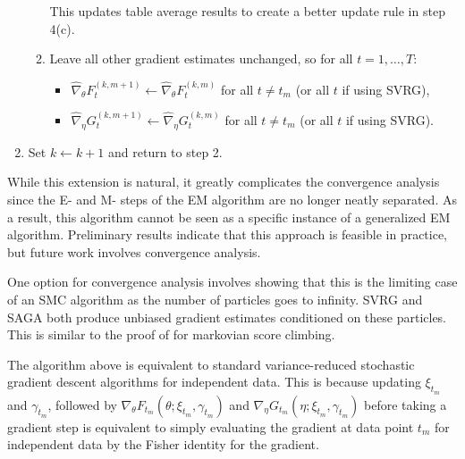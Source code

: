 \begin{enumerate}
\begin{enumerate}
\begin{itemize}
        \end{itemize}
        This updates table average results to create a better update rule in step 4(c).
        \item Leave all other gradient estimates unchanged, so for all $t = 1,\ldots,T$:
        \begin{itemize}
            \item $\widehat \nabla_\theta F_{t}^{(k,m+1)} \leftarrow \widehat \nabla_\theta F_{t}^{(k,m)}$ for all $t \neq t_m$ (or all $t$ if using SVRG),
            \item $\widehat \nabla_\eta G_{t}^{(k,m+1)} \leftarrow \widehat \nabla_\eta G_{t}^{(k,m)}$ for all $t \neq t_m$ (or all $t$ if using SVRG).
        \end{itemize}
    \end{enumerate}
    \item Set $k \leftarrow k+1$ and return to step 2.
\end{enumerate}

While this extension is natural, it greatly complicates the convergence analysis since the E- and M- steps of the EM algorithm are no longer neatly separated. As a result, this algorithm cannot be seen as a specific instance of a generalized EM algorithm. Preliminary results indicate that this approach is feasible in practice, but future work involves convergence analysis. 

One option for convergence analysis involves showing that this is the limiting case of an SMC algorithm as the number of particles goes to infinity. SVRG and SAGA both produce unbiased gradient estimates conditioned on these particles. This is similar to the proof of \citet{Naesseth:2020} for markovian score climbing.


The algorithm above is equivalent to standard variance-reduced stochastic gradient descent algorithms for independent data. This is because updating $\xi_{t_m}$ and $\gamma_{t_m}$, followed by $\nabla_{\theta} F_{t_m}(\theta;\xi_{t_m},\gamma_{t_m})$ and $\nabla_{\eta} G_{t_m}(\eta;\xi_{t_m},\gamma_{t_m})$ before taking a gradient step is equivalent to simply evaluating the gradient at data point $t_m$ for independent data by the Fisher identity for the gradient.

